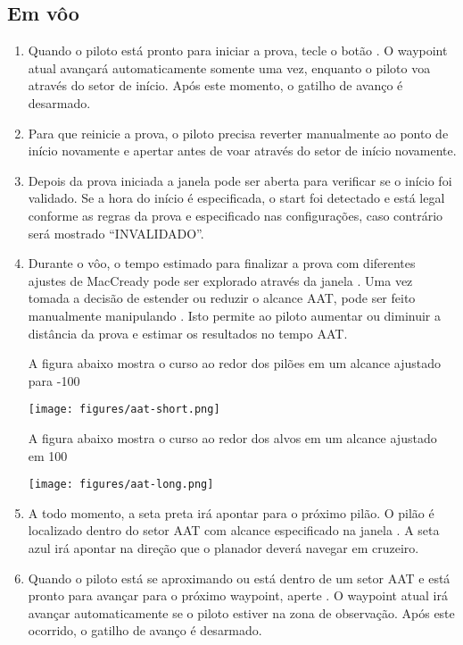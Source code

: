 \subsection*{Em vôo}
\begin{enumerate}
\item Quando o piloto está pronto para iniciar a prova, tecle o botão  . O waypoint atual avançará automaticamente somente uma vez, enquanto o piloto voa através do setor de início.  Após este momento, o gatilho de avanço é desarmado.
\item  Para que reinicie a prova, o piloto precisa reverter manualmente ao ponto de início novamente e apertar 
 antes de voar através do setor de início novamente.
\item  Depois da prova iniciada a janela   pode ser aberta para verificar se o início foi validado.  Se a hora do início é especificada, o start foi detectado e está legal conforme as regras da prova e especificado nas configurações, caso contrário será mostrado “INVALIDADO”.
\item  Durante o vôo, o tempo estimado para finalizar a prova com diferentes ajustes de MacCready pode ser explorado através da janela .
  Uma vez tomada a decisão de estender ou reduzir o alcance AAT, pode ser feito manualmente manipulando . Isto permite ao piloto aumentar ou diminuir a distância da prova e estimar os resultados no tempo AAT. 

A figura abaixo mostra o curso ao redor dos pilões em um alcance ajustado para -100%
\begin{center}
\texttt{[image: figures/aat-short.png]}
\end{center}

A figura abaixo mostra o curso ao redor dos alvos em um alcance ajustado em 100%
\begin{center}
\texttt{[image: figures/aat-long.png]}
\end{center}

\item  A todo momento, a seta preta irá apontar para o próximo pilão.  O pilão é localizado dentro do setor AAT com alcance especificado na janela  .  A seta azul irá apontar na direção que o planador deverá navegar em cruzeiro.

\item  Quando o piloto está se aproximando ou está dentro de um setor AAT e está pronto para avançar para o próximo waypoint, aperte  .  O waypoint atual irá avançar automaticamente se o piloto estiver na zona de observação.  Após este ocorrido, o gatilho de avanço é desarmado.


\end{enumerate}
